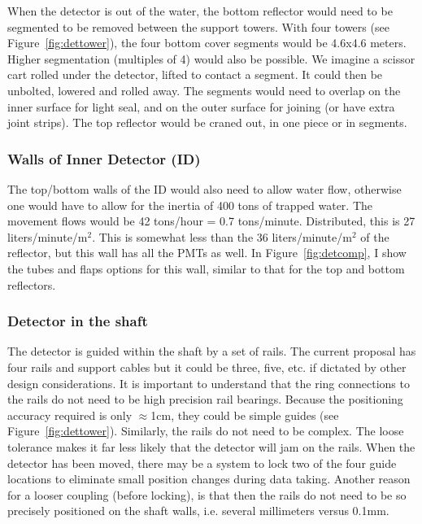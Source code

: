 When the detector is out of the water, the bottom reflector would need to be segmented to
 be removed between the support towers. With four towers (see Figure~\ref{fig:dettower}),
 the four bottom cover segments would be 4.6x4.6 meters. Higher segmentation (multiples of
 4) would also be possible. We imagine a scissor cart rolled under the detector, lifted to
 contact a segment. It could then be unbolted, lowered and rolled away. The segments would
 need to overlap on the inner surface for light seal, and on the outer surface for joining
 (or have extra joint strips). The top reflector would be craned out, in one piece or in
 segments.




\subsubsection{Walls of Inner Detector (ID)}
The top/bottom walls of the
 ID would also need to allow water flow, otherwise one would have to allow for
 the inertia of 400 tons of trapped water. The movement flows would be 42 tons/hour =
 0.7 tons/minute. Distributed, this is 27 liters/minute/m$^2$. This is somewhat less than
 the 36 liters/minute/m$^2$ of the reflector, but this wall has all the PMTs as well. In
 Figure~\ref{fig:detcomp}, I show the tubes and flaps options for this wall, similar
 to that for the top and bottom reflectors.

\subsubsection{Detector in the shaft}

The detector is guided within the shaft by a set of rails.
The current proposal has
 four rails and support cables but it could be three, five, etc. if dictated by other design considerations.
 It is important to understand that the ring connections to the rails do not need to be
 high precision rail bearings. Because the positioning accuracy required is only $\approx$1cm,
 they could be simple guides (see Figure~\ref{fig:dettower}). Similarly, the rails do not need to be
 complex. The loose tolerance makes it far less likely that the detector will jam on
 the rails. When the detector has been moved, there may be a system to lock two of the
 four guide locations to eliminate small position changes during data taking. Another
 reason for a looser coupling (before locking), is that then the rails do not need to
 be so precisely positioned on the shaft walls, i.e. several  millimeters versus
 0.1mm. 

